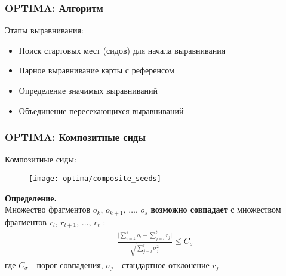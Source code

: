 


\begin{frame}
\frametitle{OPTIMA\nocite{optima}: Алгоритм}

Этапы выравнивания:
\begin{itemize}
  \item Поиск стартовых мест (сидов) для начала выравнивания
  \item Парное выравнивание карты с референсом
  \item Определение значимых выравниваний
  \item Объединение пересекающихся выравниваний
\end{itemize}

\end{frame}

\begin{frame}
\frametitle{OPTIMA: Композитные сиды}
Композитные сиды:
\begin{figure}
  \centering
  \texttt{[image: optima/composite\_seeds]}
\end{figure}
\textbf{Определение.} \\
Множество фрагментов $o_k$, $o_{k + 1}$, $ \dots$, $o_{s}$ \textbf{возможно
совпадает} с множеством фрагментов $r_l$, $r_{l+1}$, $\dots$, $r_{t}$ :
\begin{gather}
\frac{\bigg|\sum\limits_{i = k}^s o_i - \sum\limits_{j = l}^t r_j \bigg|}{\sqrt{\sum\limits_{j = l}^t \sigma_j^2}} \le C_{\sigma}
\label{eq:feasible_match}
\end{gather}
где $C_{\sigma}$ - порог совпадения, $\sigma_j$ - стандартное отклонение $r_j$

\end{frame}

